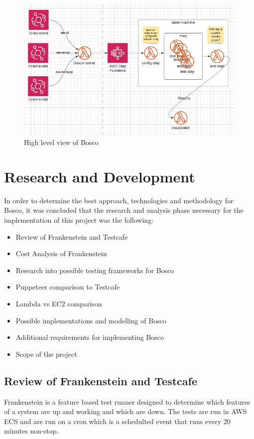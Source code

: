 \documentclass[12pt,a4paper,titlepage]{report}
\begin{document}
\begin{figure}[ht]
 \centering
 \includegraphics[width=\textwidth,height=\textheight,keepaspectratio]{./diagrams/bosco_high_level.png}
 \caption{High level view of Bosco}
\end{figure}

\chapter{Research and Development}

In order to determine the best approach, technologies and methodology for Bosco, it was concluded that the research and analysis phase necessary for the implementation of this project was the following:

\begin{itemize}
 \item Review of Frankenstein and Testcafe
 \item Cost Analysis of Frankenstein
 \item Research into possible testing frameworks for Bosco
 \item Puppeteer comparison to Testcafe
 \item Lambda vs EC2 comparison
 \item Possible implementations and modelling of Bosco
 \item Additional requirements for implementing Bosco
 \item Scope of the project
\end{itemize}

\section{Review of Frankenstein and Testcafe}
Frankenstein is a feature based test runner designed to determine
which features of a system are up and working and which are down.
The tests are run in AWS ECS and are run on a cron which is a schedulted event that runs every 20 minutes non-stop.
\end{document}
